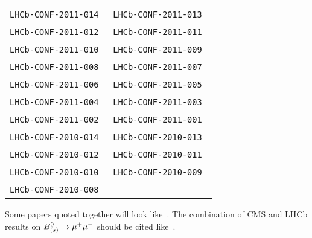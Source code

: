 \begin{center}
\begin{longtable}{ll}
\texttt{LHCb-CONF-2011-014}~\cite{LHCb-CONF-2011-014} &
\texttt{LHCb-CONF-2011-013}~\cite{LHCb-CONF-2011-013} \\
\texttt{LHCb-CONF-2011-012}~\cite{LHCb-CONF-2011-012} &
\texttt{LHCb-CONF-2011-011}~\cite{LHCb-CONF-2011-011} \\
\texttt{LHCb-CONF-2011-010}~\cite{LHCb-CONF-2011-010} &
\texttt{LHCb-CONF-2011-009}~\cite{LHCb-CONF-2011-009} \\
\texttt{LHCb-CONF-2011-008}~\cite{LHCb-CONF-2011-008} &
\texttt{LHCb-CONF-2011-007}~\cite{LHCb-CONF-2011-007} \\
\texttt{LHCb-CONF-2011-006}~\cite{LHCb-CONF-2011-006} &
\texttt{LHCb-CONF-2011-005}~\cite{LHCb-CONF-2011-005} \\
\texttt{LHCb-CONF-2011-004}~\cite{LHCb-CONF-2011-004} &
\texttt{LHCb-CONF-2011-003}~\cite{LHCb-CONF-2011-003} \\
\texttt{LHCb-CONF-2011-002}~\cite{LHCb-CONF-2011-002} &
\texttt{LHCb-CONF-2011-001}~\cite{LHCb-CONF-2011-001} \\
\hline
\texttt{LHCb-CONF-2010-014}~\cite{LHCb-CONF-2010-014} &
\texttt{LHCb-CONF-2010-013}~\cite{LHCb-CONF-2010-013} \\
\texttt{LHCb-CONF-2010-012}~\cite{LHCb-CONF-2010-012} &
\texttt{LHCb-CONF-2010-011}~\cite{LHCb-CONF-2010-011} \\
\texttt{LHCb-CONF-2010-010}~\cite{LHCb-CONF-2010-010} &
\texttt{LHCb-CONF-2010-009}~\cite{LHCb-CONF-2010-009} \\
\texttt{LHCb-CONF-2010-008}~\cite{LHCb-CONF-2010-008} & \\
\hline
\end{longtable}
\end{center}

Some \lhcb papers quoted together will look
like~\cite{LHCb-PAPER-2011-007,LHCb-PAPER-2011-006,
  LHCb-PAPER-2011-005,LHCb-PAPER-2011-004,LHCb-PAPER-2011-003}.
The combination of CMS and LHCb results on $B^0_{(s)} \rightarrow {\ensuremath{\mu^+\mu^-}}$ should be cited like~\cite{LHCb-CONF-2013-012}.

